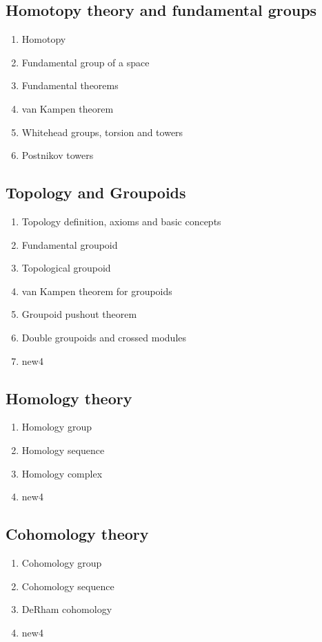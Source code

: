 \documentclass[12pt]{article}
\theoremstyle{plain}
\theoremstyle{definition}
\numberwithin{equation}{section}
\begin{document}
\subsection{Homotopy theory and fundamental groups}
\begin{enumerate}
\item Homotopy
\item Fundamental group of a space
\item Fundamental theorems
\item van Kampen theorem
\item Whitehead groups, torsion and towers
\item Postnikov towers
\end{enumerate}


\subsection{Topology and Groupoids}
\begin{enumerate}
\item Topology definition, axioms and basic concepts
\item Fundamental groupoid
\item Topological groupoid
\item van Kampen theorem for groupoids
\item Groupoid pushout theorem 
\item Double groupoids and crossed modules
\item new4

\end{enumerate}


\subsection{Homology theory}
\begin{enumerate}

\item Homology group
\item Homology sequence
\item Homology complex
\item new4

\end{enumerate}


\subsection{Cohomology theory}
\begin{enumerate}

\item Cohomology group
\item Cohomology sequence
\item DeRham cohomology
\item new4

\end{enumerate}
\end{document}
